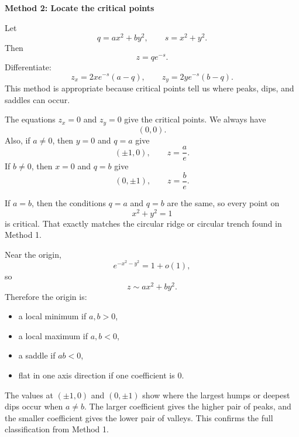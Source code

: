 \documentclass[a4paper,12pt,twocolumn]{article}
\newenvironment{solutionbox}{\begin{framed}}{\end{framed}}
\begin{document}
\begin{solutionbox}
\textbf{Method 2: Locate the critical points}

\begin{steps}
\item Let
\[
q=ax^2+by^2,\qquad s=x^2+y^2.
\]
Then
\[
z=qe^{-s}.
\]
Differentiate:
\[
z_x=2xe^{-s}(a-q),\qquad z_y=2ye^{-s}(b-q).
\]
This method is appropriate because critical points tell us where peaks, dips, and saddles can occur.

\item The equations \(z_x=0\) and \(z_y=0\) give the critical points. We always have
\[
(0,0).
\]
Also, if \(a\ne 0\), then \(y=0\) and \(q=a\) give
\[
(\pm 1,0),
\qquad z=\frac{a}{e}.
\]
If \(b\ne 0\), then \(x=0\) and \(q=b\) give
\[
(0,\pm 1),
\qquad z=\frac{b}{e}.
\]

\item If \(a=b\), then the conditions \(q=a\) and \(q=b\) are the same, so every point on
\[
x^2+y^2=1
\]
is critical. That exactly matches the circular ridge or circular trench found in Method 1.

\item Near the origin,
\[
e^{-x^2-y^2}=1+o(1),
\]
so
\[
z\sim ax^2+by^2.
\]
Therefore the origin is:
\begin{itemize}
\item a local minimum if \(a,b>0\),
\item a local maximum if \(a,b<0\),
\item a saddle if \(ab<0\),
\item flat in one axis direction if one coefficient is \(0\).
\end{itemize}

\item The values at \((\pm1,0)\) and \((0,\pm1)\) show where the largest humps or deepest dips occur when \(a\ne b\). The larger coefficient gives the higher pair of peaks, and the smaller coefficient gives the lower pair of valleys. This confirms the full classification from Method 1.
\end{steps}
\end{solutionbox}
\end{document}
